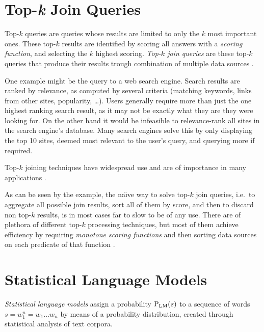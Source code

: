 \section{Top-\emph{k} Join Queries}

Top-$k$ queries are queries whose results are limited to only the $k$ most
important ones.
These top-$k$ results are identified by scoring all answers with a
\emph{scoring function}, and selecting the $k$ highest scoring.
\emph{Top-$k$ join queries} are these top-$k$ queries that produce
their results trough combination of multiple data sources \parencite{Ilyas2008}.

One example might be the query to a web search engine.
Search results are ranked by relevance, as computed by several criteria
(matching keywords, links from other sites, popularity, \ldots).
Users generally require more than just the one highest ranking search result, as
it may not be exactly what they are they were looking for.
On the other hand it would be infeasible to relevance-rank all sites in the
search engine's database.
Many search engines solve this by only displaying the top 10 sites, deemed most
relevant to the user's query, and querying more if required.

\begin{draft}
Top-$k$ joining techniques have widespread use and are of importance in
many applications \noref.
\end{draft}

As can be seen by the example, the na\"{\i}ve way to solve top-$k$ join
queries, i.e.\ to aggregate all possible join results, sort all of them by
score, and then to discard non top-$k$ results, is in most cases far to
slow to be of any use.
There are of plethora of different top-$k$ processing techniques, but most
of them achieve efficiency by requiring \emph{monotone scoring functions} and
then sorting data sources on each predicate of that function
\parencite{Ilyas2008}.

\section{Statistical Language Models}

\emph{Statistical language models} assign a probability $\Prob[\text{LM}]{s}$ to
a sequence of words $s = w_1^n = w_1 \ldots w_n$ by means of a probability
distribution, created through statistical analysis of text corpora.

